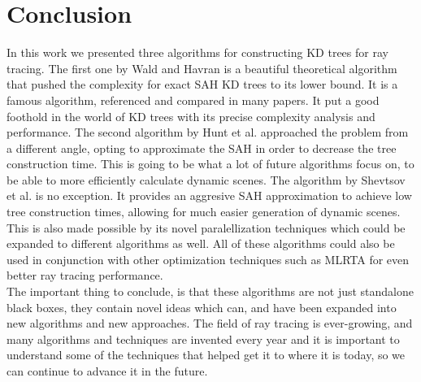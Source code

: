 \documentclass[12pt]{article}
\begin{document}
\section{Conclusion}
In this work we presented three algorithms for constructing KD trees for ray tracing. The first one by Wald and Havran \cite {wald2006building} is a beautiful theoretical algorithm that pushed the complexity for exact SAH KD trees to its lower bound. It is a famous algorithm, referenced and compared in many papers. It put a good foothold in the world of KD trees with its precise complexity analysis and performance. The second algorithm by Hunt et al. \cite{hunt2006fast} approached the problem from a different angle, opting to approximate the SAH in order to decrease the tree construction time. This is going to be what a lot of future algorithms focus on, to be able to more efficiently calculate dynamic scenes. The algorithm by Shevtsov et al. \cite{shevtsov2007highly} is no exception. It provides an aggresive SAH approximation to achieve low tree construction times, allowing for much easier generation of dynamic scenes. This is also made possible by its novel paralellization techniques which could be expanded to different algorithms as well. All of these algorithms could also be used in conjunction with other optimization techniques such as MLRTA \cite{reshetov2005multi} for even better ray tracing performance.\\
\indent The important thing to conclude, is that these algorithms are not just standalone black boxes, they contain novel ideas which can, and have been expanded into new algorithms and new approaches. The field of ray tracing is ever-growing, and many algorithms and techniques are invented every year and it is important to understand some of the techniques that helped get it to where it is today, so we can continue to advance it in the future.

\newpage
% 
% 

\nocite{*}

\end{document}
